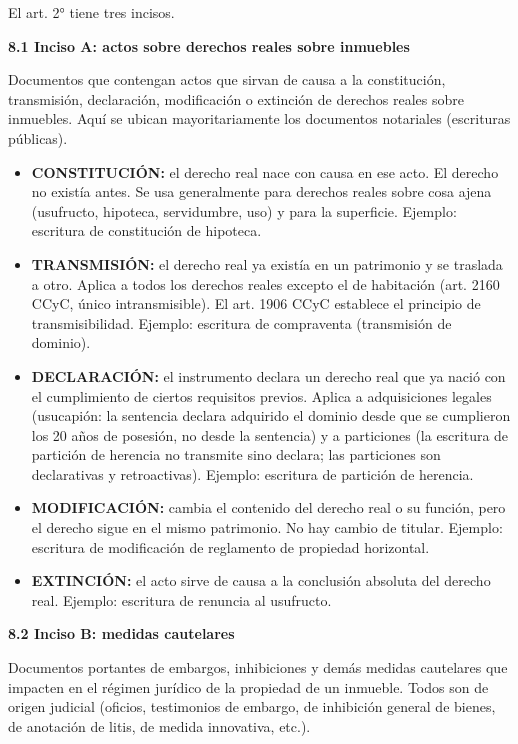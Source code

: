 \documentclass[11pt]{article}
\newcommand{\subheading}[1]{%
  \vspace{7pt}
  {\fontsize{12}{14}\selectfont\bfseries\color{navy}#1}\par
  \vspace{2pt}
}
\newenvironment{wordlist}
{\begin{itemize}[leftmargin=1.35em,itemsep=2pt,topsep=2pt,parsep=0pt]}
{\end{itemize}}
\begin{document}
El art. 2° tiene tres incisos.

\subheading{8.1 Inciso A: actos sobre derechos reales sobre inmuebles}

Documentos que contengan actos que sirvan de causa a la constitución, transmisión, declaración, modificación o extinción de derechos reales sobre inmuebles. Aquí se ubican mayoritariamente los documentos notariales (escrituras públicas).

\begin{wordlist}
\item \textbf{CONSTITUCIÓN:} el derecho real nace con causa en ese acto. El derecho no existía antes. Se usa generalmente para derechos reales sobre cosa ajena (usufructo, hipoteca, servidumbre, uso) y para la superficie. Ejemplo: escritura de constitución de hipoteca.
\item \textbf{TRANSMISIÓN:} el derecho real ya existía en un patrimonio y se traslada a otro. Aplica a todos los derechos reales excepto el de habitación (art. 2160 CCyC, único intransmisible). El art. 1906 CCyC establece el principio de transmisibilidad. Ejemplo: escritura de compraventa (transmisión de dominio).
\item \textbf{DECLARACIÓN:} el instrumento declara un derecho real que ya nació con el cumplimiento de ciertos requisitos previos. Aplica a adquisiciones legales (usucapión: la sentencia declara adquirido el dominio desde que se cumplieron los 20 años de posesión, no desde la sentencia) y a particiones (la escritura de partición de herencia no transmite sino declara; las particiones son declarativas y retroactivas). Ejemplo: escritura de partición de herencia.
\item \textbf{MODIFICACIÓN:} cambia el contenido del derecho real o su función, pero el derecho sigue en el mismo patrimonio. No hay cambio de titular. Ejemplo: escritura de modificación de reglamento de propiedad horizontal.
\item \textbf{EXTINCIÓN:} el acto sirve de causa a la conclusión absoluta del derecho real. Ejemplo: escritura de renuncia al usufructo.
\end{wordlist}

\subheading{8.2 Inciso B: medidas cautelares}

Documentos portantes de embargos, inhibiciones y demás medidas cautelares que impacten en el régimen jurídico de la propiedad de un inmueble. Todos son de origen judicial (oficios, testimonios de embargo, de inhibición general de bienes, de anotación de litis, de medida innovativa, etc.).
\end{document}
